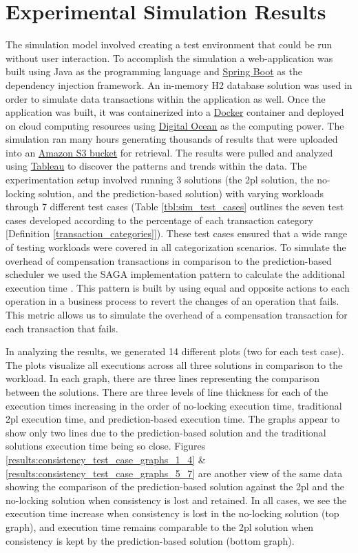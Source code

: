 \section{Experimental Simulation Results}
\label{pbs:experimentation}
The simulation model involved creating a test environment that could be run without user interaction. To accomplish the simulation a web-application was built using Java as the programming language and \href{https://spring.io/projects/spring-boot}{Spring Boot} as the dependency injection framework. An in-memory H2 database solution was used in order to simulate data transactions within the application as well. Once the application was built, it was containerized into a \href{https://www.docker.com/}{Docker} container and deployed on cloud computing resources using \href{https://www.digitalocean.com/}{Digital Ocean} as the computing power. The simulation ran many hours generating thousands of results that were uploaded into an \href{https://aws.amazon.com/s3/}{Amazon S3 bucket} for retrieval. The results were pulled and analyzed using \href{https://www.tableau.com/}{Tableau} to discover the patterns and trends within the data. The experimentation setup involved running 3 solutions (the \gls{2pl} solution, the no-locking solution, and the prediction-based solution) with varying workloads through 7 different test cases (Table \ref{tbl:sim_test_cases} outlines the seven test cases developed according to the percentage of each transaction category [Definition \ref{transaction_categories}]). These test cases ensured that a wide range of testing workloads were covered in all categorization scenarios. To simulate the overhead of compensation transactions in comparison to the prediction-based scheduler we used the SAGA implementation pattern to calculate the additional execution time \cite{SAGAS-Garcaa-Molrna}. This pattern is built by using equal and opposite actions to each operation in a business process to revert the changes of an operation that fails. This metric allows us to simulate the overhead of a compensation transaction for each transaction that fails.

In analyzing the results, we generated 14 different plots (two for each test case). The plots visualize all executions across all three solutions in comparison to the workload. In each graph, there are three lines representing the comparison between the solutions. There are three levels of line thickness for each of the execution times increasing in the order of no-locking execution time, traditional \gls{2pl} execution time, and prediction-based execution time. The graphs appear to show only two lines due to the prediction-based solution and the traditional solutions execution time being so close. Figures \ref{results:consistency_test_case_graphs_1_4} \& \ref{results:consistency_test_case_graphs_5_7} are another view of the same data showing the comparison of the prediction-based solution against the \gls{2pl} and the no-locking solution when consistency is lost and retained. In all cases, we see the execution time increase when consistency is lost in the no-locking solution (top graph), and execution time remains comparable to the \gls{2pl} solution when consistency is kept by the prediction-based solution (bottom graph).

